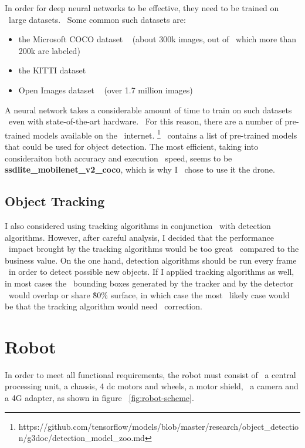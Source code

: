 In order for deep neural networks to be effective, they need to be trained on \
large datasets. \
Some common such datasets are:
\begin{itemize}
    \item the Microsoft COCO dataset ~\cite{COCO} (about 300k images, out of \
            which more than 200k are labeled)
    \item the KITTI dataset ~\cite{kitti}
    \item Open Images dataset ~\cite{openimages} (over 1.7 million images)
\end{itemize}

A neural network takes a considerable amount of time to train on such datasets \
even with state-of-the-art hardware. \
For this reason, there are a number of pre-trained models available on the \
internet.
\footnote{https://github.com/tensorflow/models/blob/master/research/object\_detection/g3doc/detection\_model\_zoo.md} \
contains a list of pre-trained models that could be used for object detection.
The most efficient, taking into consideraiton both accuracy and execution \
speed, seems to be \textbf{ssdlite\_mobilenet\_v2\_coco}, which is why I \
chose to use it the drone.

\subsection{Object Tracking}
\label{subsec:analysis-object-tracking}
I also considered using tracking algorithms in conjunction \
with detection algorithms.
However, after careful analysis, I decided that the performance \
impact brought by the tracking algorithms would be too great \
compared to the business value.
On the one hand, detection algorithms should be run every frame \
in order to detect possible new objects.
If I applied tracking algorithms as well, in most cases the \
bounding boxes generated by the tracker and by the detector \
would overlap or share \~80\% surface, in which case the most \
likely case would be that the tracking algorithm would need \
correction.


\section{Robot}
\label{sec:analysis-robot-control}
In order to meet all functional requirements, the robot must consist of \
a central processing unit, a chassis, 4 dc motors and wheels, a motor shield, \
a camera and a 4G adapter, as shown in figure ~\ref{fig:robot-scheme}.

